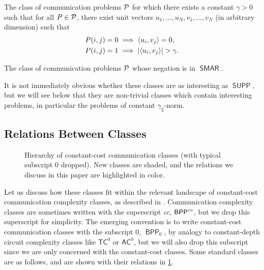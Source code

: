 \documentclass{article}
\newcommand{\cplxclass}[1]{\mathsf{#1}}
\DeclareMathOperator{\BPP}{\cplxclass{BPP}}
\DeclareMathOperator{\SUPP}{\cplxclass{SUPP}}
\DeclareMathOperator{\SMAR}{\cplxclass{SMAR}}
\DeclareMathOperator{\coSMAR}{\cplxclass{coSMAR}}
\begin{document}
\begin{description}[leftmargin=!,labelwidth=1.4cm,labelsep=0.5em]
    \item[$\SMAR$:]
    The class of communication problems $\mathcal{P}$ for which there exists a constant $\gamma > 0$
    such that for all $P \in \mathcal{P}$, there exist unit vectors $u_1, \dotsc, u_N, v_1, \dotsc, v_N$
    (in arbitrary dimension) such that
    \begin{equation}
    \label{eq:def-smar}
    \begin{aligned}
        P(i,j) = 0 &\implies \langle u_i, v_j \rangle = 0, \\
        P(i,j) = 1 &\implies |\langle u_i, v_j \rangle| > \gamma .
    \end{aligned}
    \end{equation}
    \item[$\coSMAR$:]
    The class of communication problems $\mathcal{P}$ whose negation is in $\SMAR$.
\end{description}
\noindent
It is not immediately obvious whether these classes are as interesting as $\SUPP$,
but we will see below that they are non-trivial classes which contain interesting problems,
in particular the problems of constant $\gamma_2$-norm.

\subsection{Relations Between Classes}

\begin{figure}[t]
    \begin{center}
        
    \end{center}
	\vspace{-5mm}
    \caption{Hierarchy of constant-cost communication classes (with typical subscript $0$ dropped). New classes are shaded, and the relations we discuss in this paper are highlighted in color.}
    \label{fig:hierarchy}
\end{figure}

Let us discuss how these classes fit within the relevant landscape of
constant-cost communication complexity classes, as described in \cite{HH24}.
Communication complexity classes are sometimes written with the superscript
\emph{cc}, \eg $\BPP^\emph{cc}$, but we drop this superscript for simplicity.
The emerging convention is to write constant-cost communication classes with the
subscript $0$, \eg $\BPP_0$, by analogy to constant-depth circuit complexity
classes like $\mathsf{TC}^0$ or $\mathsf{AC}^0$, but we will also drop this subscript
since we are only concerned with the constant-cost classes. Some standard classes
are as follows, and are shown with their relations in \cref{fig:hierarchy}.
\end{document}
